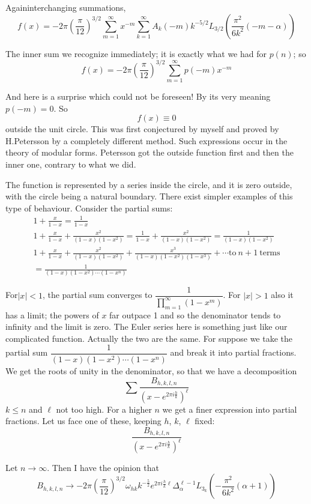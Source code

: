 Again\pageoriginale interchanging summations,
$$
f(x) = - 2 \pi \left( \frac{\pi}{12}\right)^{3/2} \sum^\infty_{m=1}
  x^{-m}  \sum^\infty_{k=1} A_k (-m) k^{-5/2} L_{3/2} \left(
  \frac{\pi^2}{6k^2} (-m - \alpha)\right)
$$

The inner sum we recognize immediately; it is exactly what we had for
$p(n)$; so 
$$
f(x) =- 2 \pi \left( \frac{\pi}{12}\right)^{3/2} \sum^\infty_{m=1}
p(-m) x^{-m}
$$

And here is a surprise which could not be foreseen! By its very
meaning $p(-m)=0$. So
$$
f(x)\equiv 0
$$
outside the unit circle. This was first conjectured by myself and
proved by H.Petersson by a completely different method. Such
expressions occur in the theory of modular forms. Petersson got the
outside function first and then the inner one, contrary to what we
did. 

The function is represented by a series inside the circle, and it is
zero outside, with the circle being a natural boundary. There exist
simpler examples of this type of behaviour. Consider the partial sums:
\begin{multline*}
  1+ \frac{x}{1-x} = \frac{1}{1-x}\\ 
  1+ \frac{x}{1-x} +
  \frac{x^2}{(1-x)(1-x^2)}= \frac{1}{1-x} + \frac{x^2}{(1-x)(1-x^2)}
    = \frac{1}{(1-x)(1-x^2)}\\
    1+ \frac{x}{1-x} +
    \frac{x^2}{(1-x)(1-x^2)}+ \frac{x^3}{(1-x)(1-x^2)(1-x^3)} + \cdots
    \text{to} ~ n+1 ~\text{terms}\\ 
    = \frac{1}{(1-x)(1-x^2)\cdots (1-x^n)}
\end{multline*}

For\pageoriginale $|x|<1$, the partial sum converges to
$\dfrac{1}{\prod\limits^\infty_{m=1} (1-x^m)}$. For $|x|>1$ also it
has a limit; the powers of $x$ far outpace 1 and so the denominator
tends to infinity and the limit is zero. The Euler series here is
something just like our complicated function. Actually the two are the
same. For suppose we take the partial sum
$\dfrac{1}{(1-x)(1-x^2)\cdots (1-x^n)}$ and break it into partial
fractions. We get the roots of unity in the denominator, so that we
have a decomposition
$$
\sum \frac{B_{h, k, l, n}}{\left( x- e^{2 \pi i \frac{h}{k}}\right)^\ell}
$$
$k \leq n$ and $\ell$ not too high. For a higher $n$ we get a finer
expression into partial fractions. Let us face one of these, keeping
$h$, $k$, $\ell$ fixed:
$$
\frac{B_{h, k, l, n}}{\left( x- e^{2 \pi i \frac{h}{k}}\right)^\ell}
$$

Let $n \to \infty$. Then I have the opinion that
$$
B_{h, k, l, n} \to - 2 \pi \left( \frac{\pi}{12}\right)^{3/2}
\omega_{hk} k^{- \frac{5}{2}} e^{2 \pi i \frac{h}{k} \ell}
\Delta_\alpha^{\ell-1} L_{3_k} \left( - \frac{\pi^2}{6k^2} (\alpha+1)\right)
$$

